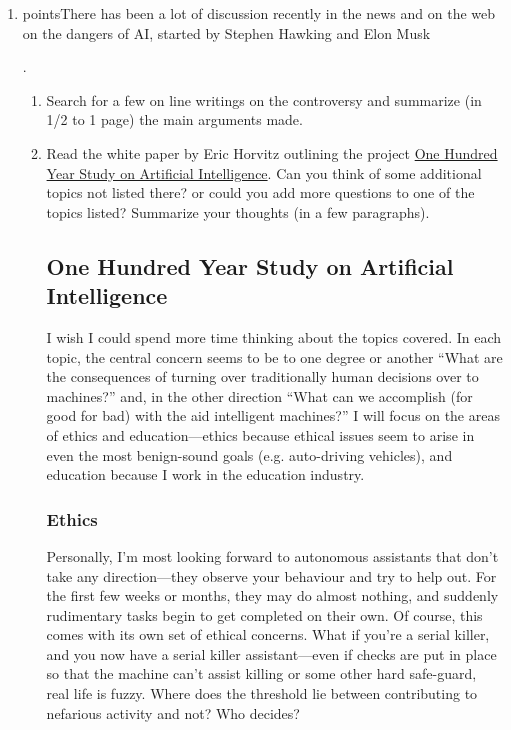 \documentclass[11pt]{article}  %
\begin{document}
\begin{enumerate}
\begin{enumerate}
{    }
    \end{enumerate}
    \item {} points\rbrack There has been a lot of discussion recently
    in the news and on the web on the dangers of AI, started by Stephen Hawking and Elon
    Musk
    \par.
    \begin{enumerate}
    \item Search for a few on line writings on the controversy and summarize (in
    1/2 to 1 page) the main arguments made.
    \item Read the white paper by Eric Horvitz outlining the project
    \href{https://stanford.app.box.com/s/266hrhww2l3gjoy9euar}{One Hundred Year Study on Artificial Intelligence}.
    Can you think of some additional topics not listed there? or could you add more
    questions to one of the topics listed? Summarize your thoughts (in a few
    paragraphs).
    \par
    \subsection{One Hundred Year Study on Artificial Intelligence}
    I wish I could spend more time thinking about the topics covered.  In each
    topic, the central concern seems to be to one degree or another ``What are
    the consequences of turning over traditionally human decisions over to
    machines?'' and, in the other direction ``What can we
    accomplish (for good for bad) with the aid intelligent machines?'' I will
    focus on the areas of ethics and education---ethics because ethical issues
    seem to arise in even the most benign-sound goals (e.g. auto-driving
    vehicles), and education because I work in the education industry.
     
    \subsubsection{Ethics}
    
    Personally, I'm most looking forward to autonomous assistants that don't
    take any direction---they observe your behaviour and try to help out.  For
    the first few weeks or months, they may do almost nothing, and suddenly
    rudimentary tasks begin to get completed on their own.  Of course, this
    comes with its own set of ethical concerns.  What if you're a serial killer,
    and you now have a serial killer assistant---even if checks are put in
    place so that the machine can't assist killing or some other hard safe-guard, 
    real life is fuzzy.  Where does the threshold lie between contributing to 
    nefarious activity and not?  Who decides?   


\end{enumerate}
\end{enumerate}
\end{document}
